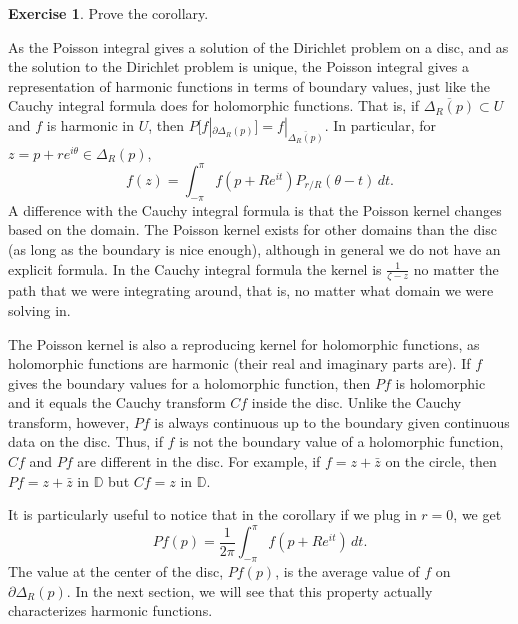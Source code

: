 \documentclass[12pt,openany]{book}
\newcommand{\R}{{\mathbb{R}}}
\newcommand{\D}{{\mathbb{D}}}
\theoremstyle{plain}
\theoremstyle{remark}
\theoremstyle{definition}
\newenvironment{exbox}{%
    \def\FrameCommand{\vrule width 1pt \relax\hspace{10pt}}%
    \MakeFramed{\advance\hsize-\width\FrameRestore}%
}{%
    \endMakeFramed
}
\theoremstyle{exercise}
\newtheorem{exercise}{Exercise}[section]
\theoremstyle{example}
\begin{document}
\begin{exbox}
\begin{exercise}
Prove the corollary.
\end{exercise}
\end{exbox}

As the Poisson integral gives a solution of the Dirichlet problem on a disc,
and as the solution to the Dirichlet problem is unique,
the Poisson integral gives
a representation of harmonic functions in terms of boundary values, just
like the Cauchy integral formula does for holomorphic functions.
That is, if $\overline{\Delta_R(p)} \subset U$ and $f$ is harmonic in $U$,
then $P[f|_{\partial \Delta_R(p)}] = f|_{\overline{\Delta_R(p)}}$.
In particular, for $z = p+re^{i\theta} \in \Delta_R(p)$,
\begin{equation*}
f(z) = \int_{-\pi}^\pi f(p+Re^{it}) P_{r/R}(\theta-t) \, dt .
\end{equation*}
A difference with the Cauchy integral formula is that the Poisson kernel
changes based on the domain.  The Poisson kernel exists for other
domains than the disc (as long as the boundary is nice enough), although
in general we do not have an explicit formula.  In
the Cauchy integral formula the kernel is $\frac{1}{\zeta-z}$
no matter the path that we were integrating around, that is, no matter
what domain we were solving in.

The Poisson kernel is also a reproducing kernel for
holomorphic functions, as holomorphic functions are harmonic
(their real and imaginary parts are).  If $f$ gives the boundary
values for a holomorphic function, then $Pf$ is holomorphic and it equals
the Cauchy transform $Cf$ inside the disc.  Unlike the
Cauchy transform, however, $Pf$ is always continuous up to the boundary given
continuous data on the disc.  Thus, if $f$ is not the boundary value of
a holomorphic function, $Cf$ and $Pf$ are different in the disc.
For example, if $f=z+\bar{z}$ on the circle, then $Pf = z+\bar{z}$ in $\D$
but $Cf = z$ in $\D$.


It is particularly useful to notice that
in the corollary if we plug in $r=0$, we get
\begin{equation} \label{eq:averageofPf}
Pf(p) = \frac{1}{2\pi} \int_{-\pi}^{\pi}f(p + R e^{it}) \, dt .
\end{equation}
The value at the center of the disc, $Pf(p)$, is the average 
value of $f$ on $\partial \Delta_R(p)$.
In the next section, we will see that this property actually characterizes
harmonic functions.
\end{document}
